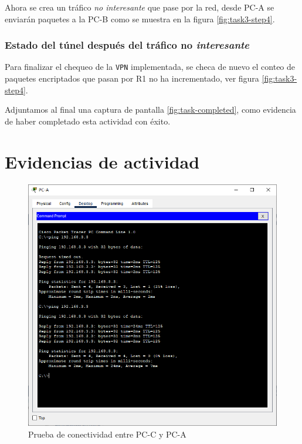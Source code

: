 \documentclass{article}
\begin{document}
                Ahora se crea un tráfico \emph{no interesante} que pase por la red, desde PC-A se enviarán paquetes a la PC-B como se muestra en la figura \ref{fig:task3-step4}.

            \subsubsection{Estado del túnel después del tráfico no \emph{interesante}}

                Para finalizar el chequeo de la \texttt{VPN} implementada, se checa de nuevo el conteo de paquetes encriptados que pasan por R1 no ha incrementado, ver figura \ref{fig:task3-step4}.
        
        Adjuntamos al final una captura de pantalla \ref{fig:task-completed}, como evidencia de haber completado esta actividad con éxito.

    \clearpage
    \appendix
    \section{Evidencias de actividad}

        \begin{figure}[!h]
            \centering
            \includegraphics[scale=0.45]{img/task1-step1.png}
            \caption{Prueba de conectividad entre PC-C y PC-A}
            \label{fig:task1-step1}
        \end{figure}
\end{document}
